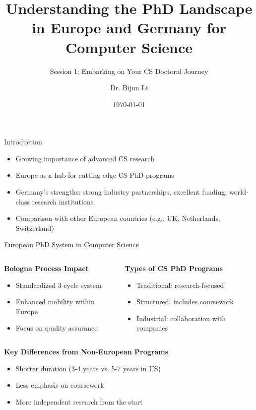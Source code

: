 \documentclass[aspectratio=169,10pt]{beamer}
\title{Understanding the PhD Landscape in Europe and Germany for Computer Science}
\subtitle{Session 1: Embarking on Your CS Doctoral Journey}
\date{\today}
\author{Dr. Bijun Li}
\institute{Expert in International Computer Science Research}
\begin{document}
\maketitle

\begin{frame}{Introduction}
    \begin{itemize}
        \item Growing importance of advanced CS research
        \item Europe as a hub for cutting-edge CS PhD programs
        \item Germany's strengths: strong industry partnerships, excellent funding, world-class research institutions
        \item Comparison with other European countries (e.g., UK, Netherlands, Switzerland)
    \end{itemize}
    
\end{frame}

\begin{frame}{European PhD System in Computer Science}
    \begin{columns}[T]
        \begin{column}{0.5\textwidth}
            \textbf{Bologna Process Impact}
            \begin{itemize}
                \item Standardized 3-cycle system
                \item Enhanced mobility within Europe
                \item Focus on quality assurance
            \end{itemize}
        \end{column}
        \begin{column}{0.5\textwidth}
            \textbf{Types of CS PhD Programs}
            \begin{itemize}
                \item Traditional: research-focused
                \item Structured: includes coursework
                \item Industrial: collaboration with companies
            \end{itemize}
        \end{column}
    \end{columns}
    
    \vspace{0.5cm}
    \textbf{Key Differences from Non-European Programs}
    \begin{itemize}
        \item Shorter duration (3-4 years vs. 5-7 years in US)
        \item Less emphasis on coursework
        \item More independent research from the start
    \end{itemize}
\end{frame}
\end{document}
